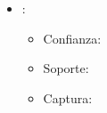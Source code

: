 \begin{itemize}
  \item \reglanumero:
  \regla
  \begin{itemize}
    \item Confianza: \confianza
    \item Soporte: \soporte
    \item Captura: \captura
  \end{itemize}

\end{itemize}